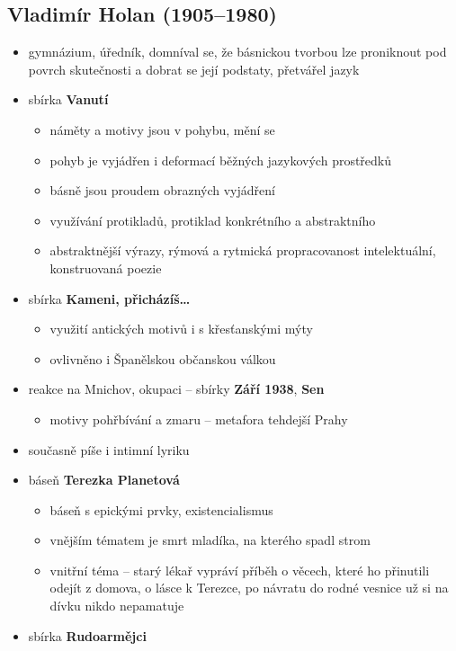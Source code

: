 \subsection{Vladimír Holan (1905--1980)}
\begin{itemize}
\item gymnázium, úředník, domníval se, že básnickou tvorbou lze proniknout pod povrch skutečnosti a dobrat se její podstaty, přetvářel jazyk
\item sbírka \textbf{Vanutí}
	\begin{itemize}
	\item náměty a motivy jsou v pohybu, mění se
	\item pohyb je vyjádřen i deformací běžných jazykových prostředků
	\item básně jsou proudem obrazných vyjádření
	\item využívání protikladů, protiklad konkrétního a abstraktního
	\item abstraktnější výrazy, rýmová a rytmická propracovanost \ra intelektuální, konstruovaná poezie
	\end{itemize}
\item sbírka \textbf{Kameni, přicházíš\ldots}
	\begin{itemize}
	\item využití antických motivů i s křesťanskými mýty
	\item ovlivněno i Španělskou občanskou válkou
	\end{itemize}
\item reakce na Mnichov, okupaci -- sbírky \textbf{Září 1938}, \textbf{Sen}
	\begin{itemize}
	\item motivy pohřbívání a zmaru -- metafora tehdejší Prahy
	\end{itemize}
\item současně píše i intimní lyriku
\item báseň \textbf{Terezka Planetová}
	\begin{itemize}
	\item báseň s epickými prvky, existencialismus
	\item vnějším tématem je smrt mladíka, na kterého spadl strom
	\item vnitřní téma -- starý lékař vypráví příběh o věcech, které ho přinutili odejít z domova, o lásce k Terezce, po návratu do rodné vesnice už si na dívku nikdo nepamatuje
	\end{itemize}
\item sbírka \textbf{Rudoarmějci}

\end{itemize}
